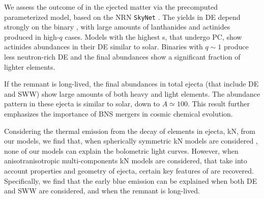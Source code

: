 We assess the outcome of \rproc{} \nuc{} in the ejected matter via the precomputed 
parameterized model, based on the \ac{NRN} \texttt{SkyNet} \citep{Lippuner:2015gwa}.
%
The \rproc{} yields in \ac{DE} depend strongly on the binary \mr{}, 
with large amounts of lanthanides and actinides produced in high-$q$ cases.
Models with the highest \mr{}s, that undergo \ac{PC}, show 
actinides abundances in their \ac{DE} similar to solar.
%
Binaries with $q \sim 1$ produce less neutron-rich \ac{DE} and the 
final abundances show a significant fraction of lighter elements. 

If the \pmerg{} remnant is long-lived, the final \rproc{} abundances in 
total ejecta (that include \ac{DE} and \ac{SWW}) show large amounts 
of both heavy and light elements. 
The abundance pattern in these ejecta is similar to solar, down to $A\simeq 100$.
This result further emphasizes   the importance of \ac{BNS} mergers in cosmic 
chemical evolution.

Considering the thermal emission from the decay of \rproc{} elements in ejecta, \ac{kN}, 
from our models, we find that, when spherically symmetric \ac{kN} models are 
considered \citep{Villar:2017wcc}, none of our models can explain 
the \AT{} bolometric light curves.
However, when anisotranisotropic multi-components \ac{kN} models are considered, 
that take into account properties and geometry of ejecta, 
certain key features of \AT{} are recovered.
Specifically, we find that the early blue emission can be explained 
when both \ac{DE} and \ac{SWW} are considered, and when the \pmerg{} remnant is long-lived.


